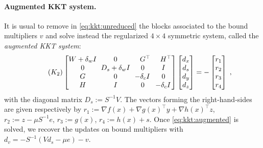 \paragraph{Augmented KKT system.}
It is usual to remove in \eqref{eq:kkt:unreduced} the blocks associated
to the bound multipliers $v$ and solve instead the regularized
$4 \times 4$ symmetric system, called the \emph{augmented KKT system}:
\begin{equation}
  \label{eq:kkt:augmented}
  \tag{$K_2$}
  \setlength\arraycolsep{3pt}
  \begin{bmatrix}
    W + \delta_w I & 0   & \phantom{-}G^\top           & \phantom{-}H^\top           \\
      0       & D_s + \delta_w I  & \phantom{-}0\phantom{^\top} & \phantom{-}I\phantom{^\top} \\
      G       & 0   & -\delta_c I  & \phantom{-}0\phantom{^\top} \\
    H       & I   & \phantom{-}0\phantom{^\top} & -\delta_c I
  \end{bmatrix}
  \begin{bmatrix}
    d_x \\
    d_s \\
    d_y \\
    d_z
  \end{bmatrix}
  = - \begin{bmatrix}
    r_1 \\ r_2 \\ r_3 \\ r_4
  \end{bmatrix} \; ,
\end{equation}
with the diagonal matrix $D_s := S^{-1} V$.
The vectors forming the right-hand-sides are given respectively by
$r_1 := \nabla f(x) + \nabla g(x)^\top y + \nabla h(x)^\top z$,
$r_2 := z - \mu S^{-1} e$,
$r_3 := g(x)$,
$r_4 := h(x) + s$.
Once \eqref{eq:kkt:augmented} is solved, we recover the updates on bound multipliers with
$d_v = - S^{-1}(V d_s - \mu e) - v$.


